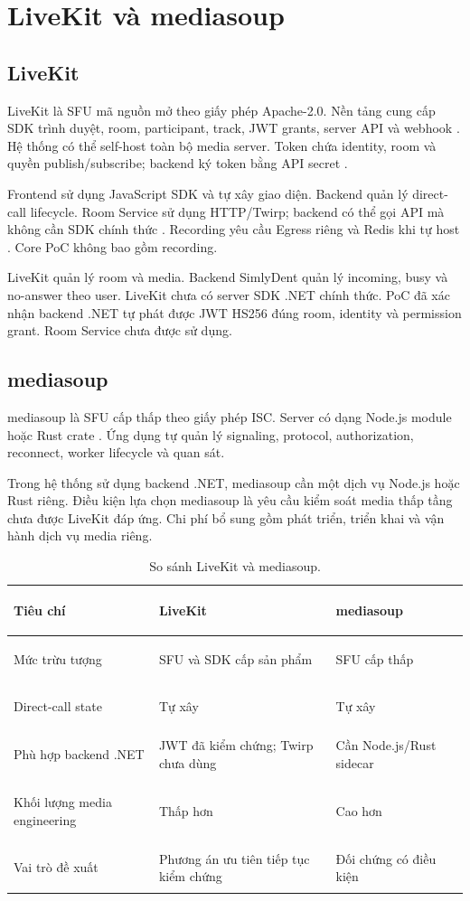 \section{LiveKit và mediasoup}

\subsection{LiveKit}

LiveKit là SFU mã nguồn mở theo giấy phép Apache-2.0. Nền tảng cung cấp SDK trình duyệt,
room, participant, track, JWT grants, server API và webhook
\cite{livekit-repo,livekit-selfhost}. Hệ thống có thể self-host toàn bộ media server.
Token chứa identity, room và quyền publish/subscribe; backend ký token bằng API secret
\cite{livekit-tokens}.

Frontend sử dụng JavaScript SDK và tự xây giao diện. Backend quản lý direct-call
lifecycle. Room Service sử dụng HTTP/Twirp; backend có thể gọi API mà không cần SDK
chính thức \cite{livekit-room-api}.
Recording yêu cầu Egress riêng và Redis khi tự host \cite{livekit-egress}. Core PoC
không bao gồm recording.

LiveKit quản lý room và media. Backend SimlyDent quản lý incoming, busy và no-answer theo
user. LiveKit chưa có server SDK .NET chính thức. PoC đã xác nhận backend .NET tự phát
được JWT HS256 đúng room, identity và permission grant. Room Service chưa được sử dụng.

\subsection{mediasoup}

mediasoup là SFU cấp thấp theo giấy phép ISC. Server có dạng Node.js module hoặc Rust
crate \cite{mediasoup-repo}. Ứng dụng tự quản lý signaling, protocol, authorization,
reconnect, worker lifecycle và quan sát.

Trong hệ thống sử dụng backend .NET, mediasoup cần một dịch vụ Node.js hoặc Rust riêng.
Điều kiện lựa chọn mediasoup là yêu cầu kiểm soát media thấp tầng chưa được LiveKit đáp
ứng. Chi phí bổ sung gồm phát triển, triển khai và vận hành dịch vụ media riêng.

\begin{table}[htbp]
\centering
\small
\begin{tabularx}{\textwidth}{|>{\bfseries\raggedright\arraybackslash}p{}|>{\raggedright\arraybackslash}X|>{\raggedright\arraybackslash}X|}
\hline
Tiêu chí & LiveKit & mediasoup \\
\hline
Mức trừu tượng & SFU và SDK cấp sản phẩm & SFU cấp thấp \\
\hline
Direct-call state & Tự xây & Tự xây \\
\hline
Phù hợp backend .NET & JWT đã kiểm chứng; Twirp chưa dùng & Cần Node.js/Rust sidecar \\
\hline
Khối lượng media engineering & Thấp hơn & Cao hơn \\
\hline
Vai trò đề xuất & Phương án ưu tiên tiếp tục kiểm chứng & Đối chứng có điều kiện \\
\hline
\end{tabularx}
\caption{So sánh LiveKit và mediasoup.}
\label{tab:livekit-mediasoup}
\end{table}
